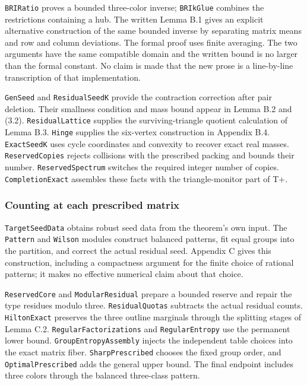 \documentclass[english,11pt,a4paper]{article}
\begin{document}
\texttt{BRIRatio} proves a bounded three-color inverse; \texttt{BRIk\allowbreak{}Glue} combines the restrictions containing a hub. The written Lemma B.1 gives an explicit alternative construction of the same bounded inverse by separating matrix means and row and column deviations. The formal proof uses finite averaging. The two arguments have the same compatible domain and the written bound is no larger than the formal constant. No claim is made that the new prose is a line-by-line transcription of that implementation.

\texttt{Gen\allowbreak{}Seed} and \texttt{Residual\allowbreak{}Seed\allowbreak{}K} provide the contraction correction after pair deletion. Their smallness condition and mass bound appear in Lemma B.2 and (3.2). \texttt{Residual\allowbreak{}Lattice} supplies the surviving-triangle quotient calculation of Lemma B.3. \texttt{Hinge} supplies the six-vertex construction in Appendix B.4. \texttt{Exact\allowbreak{}Seed\allowbreak{}K} uses cycle coordinates and convexity to recover exact real masses. \texttt{Reserved\allowbreak{}Copies} rejects collisions with the prescribed packing and bounds their number. \texttt{Reserved\allowbreak{}Spectrum} switches the required integer number of copies. \texttt{Completion\allowbreak{}Exact} assembles these facts with the triangle-monitor part of T+.

\subsubsection{Counting at each prescribed matrix}\label{counting-at-each-prescribed-matrix}

\texttt{Target\allowbreak{}Seed\allowbreak{}Data} obtains robust seed data from the theorem's own input. The \texttt{Pattern} and \texttt{Wilson} modules construct balanced patterns, fit equal groups into the partition, and correct the actual residual seed. Appendix C gives this construction, including a compactness argument for the finite choice of rational patterns; it makes no effective numerical claim about that choice.

\texttt{Reserved\allowbreak{}Core} and \texttt{Modular\allowbreak{}Residual} prepare a bounded reserve and repair the type residues modulo three. \texttt{Residual\allowbreak{}Quotas} subtracts the actual residual counts. \texttt{Hilton\allowbreak{}Exact} preserves the three outline marginals through the splitting stages of Lemma C.2. \texttt{Regular\allowbreak{}Factorizations} and \texttt{Regular\allowbreak{}Entropy} use the permanent lower bound. \texttt{Group\allowbreak{}Entropy\allowbreak{}Assembly} injects the independent table choices into the exact matrix fiber. \texttt{Sharp\allowbreak{}Prescribed} chooses the fixed group order, and \texttt{Optimal\allowbreak{}Prescribed} adds the general upper bound. The final endpoint includes three colors through the balanced three-class pattern.
\end{document}
